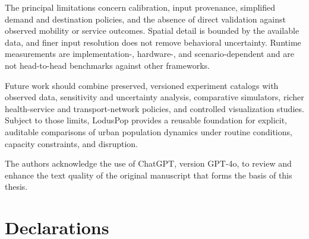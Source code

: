 \documentclass[pdflatex,sn-mathphys-num]{sn-jnl}%
\theoremstyle{thmstyleone}%
\theoremstyle{thmstyletwo}%
\theoremstyle{thmstylethree}%
\begin{document}
The principal limitations concern calibration, input provenance, simplified demand and destination policies, and the absence of direct validation against observed mobility or service outcomes. Spatial detail is bounded by the available data, and finer input resolution does not remove behavioral uncertainty. Runtime measurements are implementation-, hardware-, and scenario-dependent and are not head-to-head benchmarks against other frameworks.

Future work should combine preserved, versioned experiment catalogs with observed data, sensitivity and uncertainty analysis, comparative simulators, richer health-service and transport-network policies, and controlled visualization studies. Subject to those limits, LodusPop provides a reusable foundation for explicit, auditable comparisons of urban population dynamics under routine conditions, capacity constraints, and disruption.

\backmatter

The authors acknowledge the use of ChatGPT, version GPT-4o, to review and enhance the text quality of the original manuscript that forms the basis of this thesis.
    
\section*{Declarations}

\end{document}
